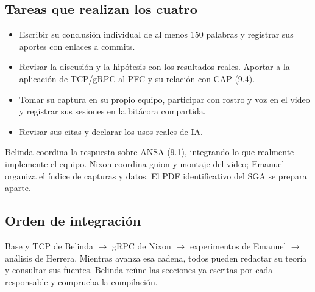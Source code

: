 \subsection*{Tareas que realizan los cuatro}
\begin{itemize}
    \item Escribir su conclusión individual de al menos 150 palabras y registrar
    sus aportes con enlaces a commits.
    \item Revisar la discusión y la hipótesis con los resultados reales.
    Aportar a la aplicación de TCP/gRPC al PFC y su relación con CAP (9.4).
    \item Tomar su captura en su propio equipo, participar con rostro y voz en
    el video y registrar sus sesiones en la bitácora compartida.
    \item Revisar sus citas y declarar los usos reales de IA.
\end{itemize}

Belinda coordina la respuesta sobre ANSA (9.1), integrando lo que realmente
implemente el equipo. Nixon coordina guion y montaje del video; Emanuel organiza
el índice de capturas y datos. El PDF identificativo del SGA se prepara aparte.

\subsection*{Orden de integración}
Base y TCP de Belinda $\rightarrow$ gRPC de Nixon $\rightarrow$ experimentos de
Emanuel $\rightarrow$ análisis de Herrera. Mientras avanza esa cadena, todos
pueden redactar su teoría y consultar sus fuentes. Belinda reúne las secciones
ya escritas por cada responsable y comprueba la compilación.
